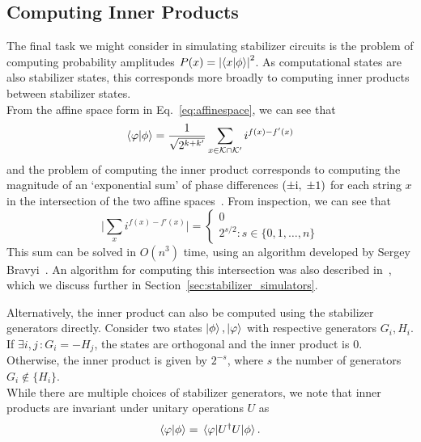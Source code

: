 \subsection{Computing Inner Products}\label{sec:innerproduct}
The final task we might consider in simulating stabilizer circuits is the problem of computing probability amplitudes $P(x)=\left\vert \braket{x}{\phi}\right\vert^{2}$. As computational states are also stabilizer states, this corresponds more broadly to computing inner products between stabilizer states.\\
From the affine space form in Eq.~\ref{eq:affinespace}, we can see that
\begin{equation}
\braket{\varphi}{\phi} = \frac{1}{\sqrt{2^{k+k'}}}\sum_{x\in\mathcal{K}\cap\mathcal{K'}} i^{f(x)-f'(x)}\label{eq:affine_ip}
\end{equation}
and the problem of computing the inner product corresponds to computing the magnitude of an `exponential sum' of phase differences $(\pm\mathrm{i},\;\pm 1)$ for each string $x$ in the intersection of the two affine spaces~\cite{Bravyi2016}. From inspection, we can see that
\begin{equation}\vert \sum_{x} i^{f(x)-f'(x)}\vert = \begin{cases}
0 \\
2^{s/2} : s\in\{0,1,\dots,n\}
\end{cases}
\end{equation}
This sum can be solved in $O(n^{3})$ time, using an algorithm developed by Sergey Bravyi~\cite{Bravyi2016,Bravyi2018,Bravyi2017}. An algorithm for computing this intersection was also described in~\cite{Bravyi2016}, which we discuss further in Section~\ref{sec:stabilizer_simulators}.\par
Alternatively, the inner product can also be computed using the stabilizer generators directly. Consider two states $\ket{\phi},\ket{\varphi}$ with respective generators $G_{i},H_{i}$. If $\exists i,j\,:G_{i}=-H_{j}$, the states are orthogonal and the inner product is $0$. Otherwise, the inner product is given by $2^{-s}$, where $s$ the number of generators $G_{i}\notin \{H_{i}\}$.\\
While there are multiple choices of stabilizer generators, we note that inner products are invariant under unitary operations $U$ as
\begin{equation}
\braket{\varphi}{\phi} = \matrixel{\varphi}{U^{\dagger}U}{\phi}.
\end{equation}
